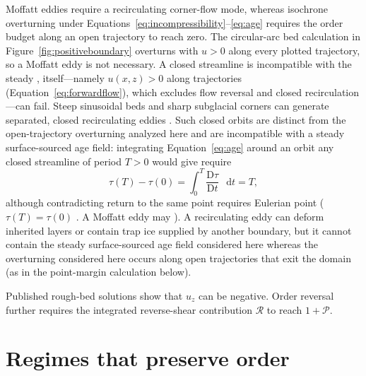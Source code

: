 \documentclass[review]{igs}
\providecommand{\DIFadd}[1]{{\protect\color{blue} \sf #1}} %
\providecommand{\DIFdel}[1]{{\protect\color{red} \scriptsize #1}} %
\providecommand{\DIFaddbegin}{} %
\providecommand{\DIFaddend}{} %
\providecommand{\DIFdelbegin}{} %
\providecommand{\DIFdelend}{} %
\newcommand{\DIFscaledelfig}{0.5}
\newlength{\DIFdelgraphicswidth} %
\newlength{\DIFdelgraphicsheight} %
\newcommand{\DIFaddincludegraphics}[2][]{{\color{blue}\fbox{\DIFOincludegraphics[#1]{#2}}}} %
\newcommand{\DIFdelincludegraphics}[2][]{%
\sbox{\DIFdelgraphicsbox}{\DIFOincludegraphics[#1]{#2}}%
\settoboxwidth{\DIFdelgraphicswidth}{\DIFdelgraphicsbox} %
\settoboxtotalheight{\DIFdelgraphicsheight}{\DIFdelgraphicsbox} %
\scalebox{\DIFscaledelfig}{%
\parbox[b]{\DIFdelgraphicswidth}{\usebox{\DIFdelgraphicsbox}\\[-\baselineskip] \rule{\DIFdelgraphicswidth}{0em}}\llap{\resizebox{\DIFdelgraphicswidth}{\DIFdelgraphicsheight}{%
\setlength{\unitlength}{\DIFdelgraphicswidth}%
\begin{picture}(1,1)%
\thicklines\linethickness{2pt} %
{\color[rgb]{1,0,0}\put(0,0){\framebox(1,1){}}}%
{\color[rgb]{1,0,0}\put(0,0){\line( 1,1){1}}}%
{\color[rgb]{1,0,0}\put(0,1){\line(1,-1){1}}}%
\end{picture}%
}\hspace*{3pt}}} %
} %
\DeclareRobustCommand{\DIFaddbegin}{\DIFOaddbegin \let\includegraphics\DIFaddincludegraphics} %
\DeclareRobustCommand{\DIFaddend}{\DIFOaddend \let\includegraphics\DIFOincludegraphics} %
\DeclareRobustCommand{\DIFdelbegin}{\DIFOdelbegin \let\includegraphics\DIFdelincludegraphics} %
\DeclareRobustCommand{\DIFdelend}{\DIFOaddend \let\includegraphics\DIFOincludegraphics} %
\begin{document}
\DIFdel{Moffatt eddies require a recirculating corner-flow mode, whereas isochrone overturning under Equations~\ref{eq:incompressibility}--\ref{eq:age} requires the order budget along an open trajectory to reach zero. The circular-arc bed calculation in Figure~\ref{fig:positiveboundary} overturns with \(u>0\) along every plotted trajectory, so a Moffatt eddy is not necessary. A closed streamline is incompatible with the steady , }\DIFdelend \DIFaddbegin \DIFadd{itself---namely \(u(x,z)>0\) along trajectories (Equation~\ref{eq:forwardflow}), which excludes flow reversal and closed recirculation---can fail. Steep sinusoidal beds and sharp subglacial corners can generate separated, closed recirculating eddies \citep{Gudmundsson1997nonlinear,Moffatt1964,MeyerCreyts2017}. Such closed orbits are distinct from the open-trajectory overturning analyzed here and are incompatible with a steady }\DIFaddend surface-sourced age field: integrating Equation~\ref{eq:age} around \DIFdelbegin \DIFdel{an orbit }\DIFdelend \DIFaddbegin \DIFadd{any closed streamline }\DIFaddend of period \(T>0\) would \DIFdelbegin \DIFdel{give
}\DIFdelend \DIFaddbegin \DIFadd{require
}\DIFaddend \begin{equation*}
\tau(T)-\tau(0)
=
\int_0^T\frac{\mathrm{D}\tau}{\mathrm{D}t}\,\mathop{}\!\mathrm{d} t
=T,
\end{equation*}
\DIFdelbegin \DIFdel{although }\DIFdelend \DIFaddbegin \DIFadd{contradicting }\DIFaddend return to the same \DIFdelbegin \DIFdel{point requires }\DIFdelend \DIFaddbegin \DIFadd{Eulerian point (}\DIFaddend \(\tau(T)=\tau(0)\)\DIFdelbegin \DIFdel{. A Moffatt eddy may }\DIFdelend \DIFaddbegin \DIFadd{). A recirculating eddy can }\DIFaddend deform inherited layers or \DIFdelbegin \DIFdel{contain }\DIFdelend \DIFaddbegin \DIFadd{trap }\DIFaddend ice supplied by another boundary, \DIFdelbegin \DIFdel{but it cannot contain the steady surface-sourced age field considered here }\DIFdelend \DIFaddbegin \DIFadd{whereas the overturning considered here occurs along open trajectories that exit the domain (as in the point-margin calculation below)}\DIFaddend .

\DIFdelbegin \DIFdel{Published rough-bed solutions show that \(u_z\) can be negative. Order reversal further requires the integrated reverse-shear contribution \(\mathcal{R}\) to reach \(1+\mathcal{P}\).
}%

\DIFdelend \section{Regimes that preserve order}
\end{document}
